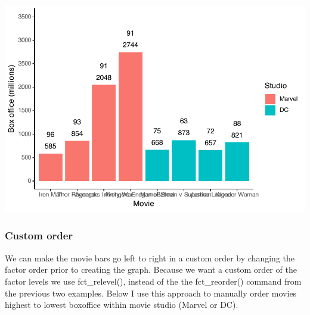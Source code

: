 \documentclass[
]{krantz}
\makeatletter
\newenvironment{Shaded}{\begin{snugshade}}{\end{snugshade}}
\newcommand{\DataTypeTok}[1]{\textcolor[rgb]{0.27,0.27,0.27}{#1}}
\newcommand{\KeywordTok}[1]{\textcolor[rgb]{0.27,0.27,0.27}{\textbf{#1}}}
\newcommand{\NormalTok}[1]{#1}
\newcommand{\OperatorTok}[1]{\textcolor[rgb]{0.43,0.43,0.43}{\textbf{#1}}}
\newcommand{\StringTok}[1]{\textcolor[rgb]{0.5,0.5,0.5}{#1}}
\newenvironment{kframe}{%
\medskip{}
\setlength{\fboxsep}{.8em}
 \def\at@end@of@kframe{}%
 \ifinner\ifhmode%
  \def\at@end@of@kframe{\end{minipage}}%
  \begin{minipage}{\columnwidth}%
 \fi\fi%
 \def\FrameCommand##1{\hskip\@totalleftmargin \hskip-\fboxsep
 \colorbox{shadecolor}{##1}\hskip-\fboxsep
     \hskip-\linewidth \hskip-\@totalleftmargin \hskip\columnwidth}%
 \MakeFramed {\advance\hsize-\width
   \@totalleftmargin\z@ \linewidth\hsize
   \@setminipage}}%
 {\par\unskip\endMakeFramed%
 \at@end@of@kframe}
\renewenvironment{Shaded}{\begin{kframe}}{\end{kframe}}
\makeatother
\begin{document}
\includegraphics[width=0.65\linewidth]{bookdown_files/figure-latex/unnamed-chunk-129-1}

\hypertarget{custom-order}{%
\subsubsection{Custom order}\label{custom-order}}

We can make the movie bars go left to right in a custom order by changing the factor order prior to creating the graph. Because we want a custom order of the factor levels we use fct\_relevel(), instead of the the fct\_reorder() command from the previous two examples. Below I use this approach to manually order movies highest to lowest boxoffice within movie studio (Marvel or DC).

\begin{Shaded}
\end{Shaded}
\end{document}
